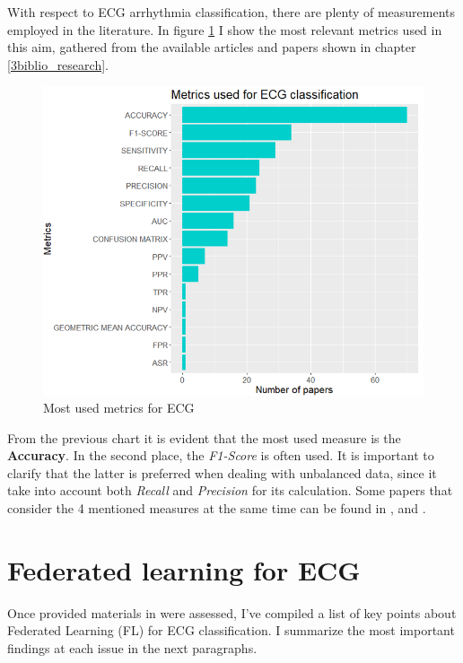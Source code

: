 With respect to ECG arrhythmia classification, there are plenty of measurements employed in the literature. In figure \ref{fig:metrics_ECG} I show the most relevant metrics used in this aim, gathered from the available articles and papers shown in chapter \ref{3biblio_research}. 

 \begin{figure}[H]
\centering
\includegraphics[scale=0.48]{img/metrics_ECG.PNG}
\caption{Most used metrics for ECG}
\label{fig:metrics_ECG}
\end{figure}

From the previous chart it is evident that the most used measure is the \textbf{Accuracy}. In the second place, the \textit{F1-Score} is often used. It is important to clarify that the latter is preferred when dealing with unbalanced data, since it take into account both \textit{Recall} and \textit{Precision} for its calculation. Some papers that consider the 4 mentioned measures at the same time can be found in \cite{metrics_ecg1}, 
\cite{metrics_ecg2} and \cite{metrics_ecg3}.


\section{Federated learning for ECG} \label{3state_art_FL}

Once provided materials in \cite{systematic_review} were assessed, I've compiled a list of key points about Federated Learning (FL) for ECG classification. I summarize the most important findings at each issue in the next paragraphs.


